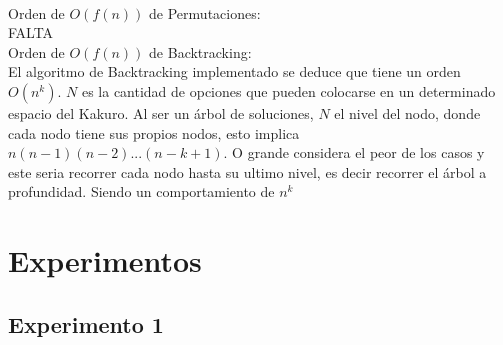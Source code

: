 \documentclass[conference]{IEEEtran}
\begin{document}
\\
Orden de $O(f(n))$ de Permutaciones:\\
FALTA
\\
Orden de $O(f(n))$ de Backtracking:\\
El algoritmo de Backtracking implementado se deduce que tiene un orden $O(n^k)$. $N$ es la cantidad de opciones que pueden colocarse en un determinado espacio del Kakuro. Al ser un \'arbol de soluciones, $N$ el nivel del nodo,  donde cada nodo tiene sus propios nodos, esto implica $n(n-1)(n-2)...(n-k+1)$. O grande considera el peor de los casos y este seria recorrer cada nodo hasta su ultimo nivel, es decir recorrer el \'arbol a profundidad. Siendo un comportamiento de $n^k$


\section{Experimentos}
\subsection{Experimento 1}


\end{document}
